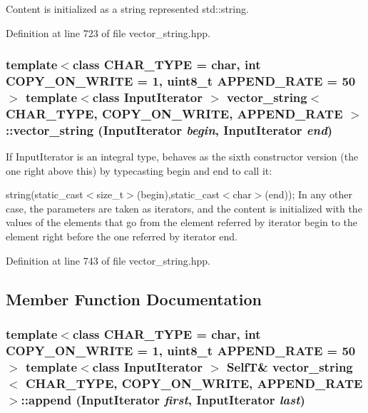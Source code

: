 Content is initialized as a string represented std::string. 

Definition at line 723 of file vector\_\-string.hpp.\hypertarget{classvector__string_846b1252f511e36c8209c7122f66fb7c}{
\subsubsection[{vector\_\-string}]{\setlength{\rightskip}{0pt plus 5cm}template$<$class CHAR\_\-TYPE  = char, int COPY\_\-ON\_\-WRITE = 1, uint8\_\-t APPEND\_\-RATE = 50$>$ template$<$class InputIterator $>$ {\bf vector\_\-string}$<$ CHAR\_\-TYPE, COPY\_\-ON\_\-WRITE, APPEND\_\-RATE $>$::{\bf vector\_\-string} (InputIterator {\em begin}, \/  InputIterator {\em end})}}
\label{classvector__string_846b1252f511e36c8209c7122f66fb7c}


If InputIterator is an integral type, behaves as the sixth constructor version (the one right above this) by typecasting begin and end to call it:

string(static\_\-cast$<$size\_\-t$>$(begin),static\_\-cast$<$char$>$(end)); In any other case, the parameters are taken as iterators, and the content is initialized with the values of the elements that go from the element referred by iterator begin to the element right before the one referred by iterator end. 

Definition at line 743 of file vector\_\-string.hpp.

\subsection{Member Function Documentation}
\hypertarget{classvector__string_cd86d82c4f9a8f2260d09e0fc22ad073}{
\subsubsection[{append}]{\setlength{\rightskip}{0pt plus 5cm}template$<$class CHAR\_\-TYPE  = char, int COPY\_\-ON\_\-WRITE = 1, uint8\_\-t APPEND\_\-RATE = 50$>$ template$<$class InputIterator $>$ {\bf SelfT}\& {\bf vector\_\-string}$<$ CHAR\_\-TYPE, COPY\_\-ON\_\-WRITE, APPEND\_\-RATE $>$::append (InputIterator {\em first}, \/  InputIterator {\em last})}}
\label{classvector__string_cd86d82c4f9a8f2260d09e0fc22ad073}


